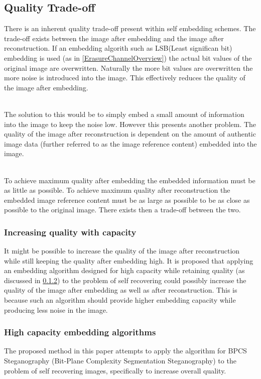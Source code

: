 \documentclass[12pt]{article}
\begin{document}
\subsection{Quality Trade-off}
\label{introQualityTrade}
There is an inherent quality trade-off present within self embedding schemes.
The trade-off exists between the image after embedding and the image after reconstruction.
If an embedding algorith such as LSB(Least significan bit) embedding is used (as in \ref{ErasureChannelOverview}) the actual bit values of the original image are overwritten.
Naturally the more bit values are overwritten the more noise is introduced into the image.
This effectively reduces the quality of the image after embedding.

\hspace{0pt} \\
The solution to this would be to simply embed a small amount of information into the image to keep the noise low.
However this presents another problem.
The quality of the image after reconstruction is dependent on the amount of authentic image data (further referred to as the image reference content) embedded into the image.

\hspace{0pt} \\
To achieve maximum quality after embedding the embedded information must be as little as possible.
To achieve maximum quality after reconstruction the embedded image reference content must be as large as possible to be as close as possible to the original image.
There exists then a trade-off between the two.

\subsubsection{Increasing quality with capacity}
\label{introQualityIncrease}
It might be possible to increase the quality of the image after reconstruction while still keeping the quality after embedding high.
It is proposed that applying an embedding algorithm designed for high capacity while retaining quality (as discussed in \ref{introHighCap}) to the problem of self recovering could possibly increase the quality of the image after embedding as well as after reconstruction.
This is because such an algorithm should provide higher embedding capacity while producing less noise in the image. 

\subsubsection{High capacity embedding algorithms}
\label{introHighCap}
The proposed method in this paper attempts to apply the algorithm for BPCS Steganography (Bit-Plane Complexity Segmentation Steganography) \cite{beaullieubpcs} to the problem of self recovering images, specifically to increase overall quality.
\end{document}
